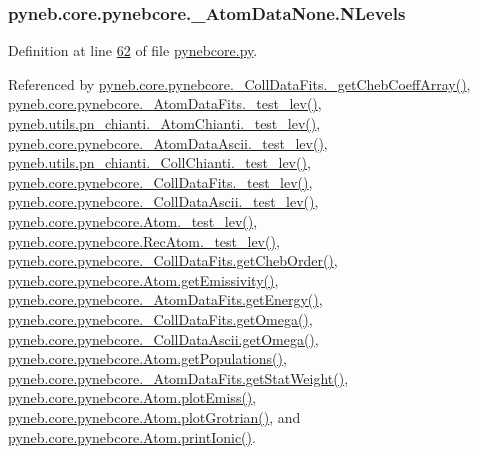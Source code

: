 \hypertarget{classpyneb_1_1core_1_1pynebcore_1_1___atom_data_none_a784a8906a9fd1b408b567989207aca84}{}
\subsubsection[{N\+Levels}]{\setlength{\rightskip}{0pt plus 5cm}pyneb.\+core.\+pynebcore.\+\_\+\+Atom\+Data\+None.\+N\+Levels}\label{classpyneb_1_1core_1_1pynebcore_1_1___atom_data_none_a784a8906a9fd1b408b567989207aca84}


Definition at line \hyperlink{pynebcore_8py_source_l00062}{62} of file \hyperlink{pynebcore_8py_source}{pynebcore.\+py}.



Referenced by \hyperlink{pynebcore_8py_source_l00734}{pyneb.\+core.\+pynebcore.\+\_\+\+Coll\+Data\+Fits.\+\_\+get\+Cheb\+Coeff\+Array()}, \hyperlink{pynebcore_8py_source_l00171}{pyneb.\+core.\+pynebcore.\+\_\+\+Atom\+Data\+Fits.\+\_\+test\+\_\+lev()}, \hyperlink{pn__chianti_8py_source_l00284}{pyneb.\+utils.\+pn\+\_\+chianti.\+\_\+\+Atom\+Chianti.\+\_\+test\+\_\+lev()}, \hyperlink{pynebcore_8py_source_l00435}{pyneb.\+core.\+pynebcore.\+\_\+\+Atom\+Data\+Ascii.\+\_\+test\+\_\+lev()}, \hyperlink{pn__chianti_8py_source_l00449}{pyneb.\+utils.\+pn\+\_\+chianti.\+\_\+\+Coll\+Chianti.\+\_\+test\+\_\+lev()}, \hyperlink{pynebcore_8py_source_l00660}{pyneb.\+core.\+pynebcore.\+\_\+\+Coll\+Data\+Fits.\+\_\+test\+\_\+lev()}, \hyperlink{pynebcore_8py_source_l01026}{pyneb.\+core.\+pynebcore.\+\_\+\+Coll\+Data\+Ascii.\+\_\+test\+\_\+lev()}, \hyperlink{pynebcore_8py_source_l01459}{pyneb.\+core.\+pynebcore.\+Atom.\+\_\+test\+\_\+lev()}, \hyperlink{pynebcore_8py_source_l02596}{pyneb.\+core.\+pynebcore.\+Rec\+Atom.\+\_\+test\+\_\+lev()}, \hyperlink{pynebcore_8py_source_l00694}{pyneb.\+core.\+pynebcore.\+\_\+\+Coll\+Data\+Fits.\+get\+Cheb\+Order()}, \hyperlink{pynebcore_8py_source_l01716}{pyneb.\+core.\+pynebcore.\+Atom.\+get\+Emissivity()}, \hyperlink{pynebcore_8py_source_l00268}{pyneb.\+core.\+pynebcore.\+\_\+\+Atom\+Data\+Fits.\+get\+Energy()}, \hyperlink{pynebcore_8py_source_l00811}{pyneb.\+core.\+pynebcore.\+\_\+\+Coll\+Data\+Fits.\+get\+Omega()}, \hyperlink{pynebcore_8py_source_l01063}{pyneb.\+core.\+pynebcore.\+\_\+\+Coll\+Data\+Ascii.\+get\+Omega()}, \hyperlink{pynebcore_8py_source_l01496}{pyneb.\+core.\+pynebcore.\+Atom.\+get\+Populations()}, \hyperlink{pynebcore_8py_source_l00242}{pyneb.\+core.\+pynebcore.\+\_\+\+Atom\+Data\+Fits.\+get\+Stat\+Weight()}, \hyperlink{pynebcore_8py_source_l02313}{pyneb.\+core.\+pynebcore.\+Atom.\+plot\+Emiss()}, \hyperlink{pynebcore_8py_source_l02372}{pyneb.\+core.\+pynebcore.\+Atom.\+plot\+Grotrian()}, and \hyperlink{pynebcore_8py_source_l02167}{pyneb.\+core.\+pynebcore.\+Atom.\+print\+Ionic()}.

